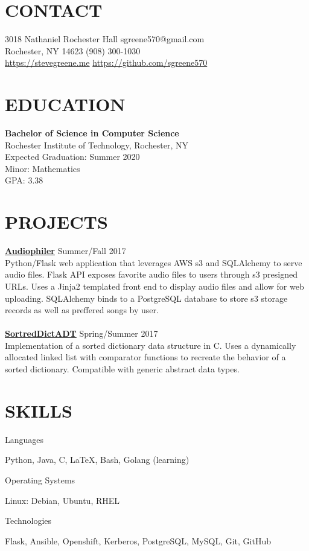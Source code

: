 \documentclass[line, margin, 11pt]{res}
\begin{document}

\begin{resume}

\section {CONTACT}
3018 Nathaniel Rochester Hall \hfill sgreene570@gmail.com \\
Rochester, NY 14623 \hfill (908) 300-1030 \\
\url{https://stevegreene.me} \hfill \url{https://github.com/sgreene570}

\section{EDUCATION}
{\bf Bachelor of Science in Computer Science} \\
Rochester Institute of Technology, Rochester, NY \\
Expected Graduation: Summer 2020 \\
Minor: Mathematics \\
GPA: 3.38

\section{PROJECTS}
{\bf \href{https://github.com/sgreene570/audiophiler}{Audiophiler}} \hfill Summer/Fall 2017 \\
Python/Flask web application that leverages AWS s3 and SQLAlchemy to serve audio
files.  Flask API exposes favorite audio files to users through s3 presigned URLs.
Uses a Jinja2 templated front end to display audio files and allow for web uploading.  SQLAlchemy binds
to a PostgreSQL database to store s3 storage records as well as preffered songs by user.
\\
\\
{\bf \href{https://github.com/sgreene570/SortedDictADT}{SortredDictADT}} \hfill Spring/Summer 2017 \\
Implementation of a sorted dictionary data structure in C.  Uses a dynamically allocated linked list with comparator functions
to recreate the behavior of a sorted dictionary.  Compatible with generic abstract data types.

\section{SKILLS}
\begin{compactdesc}
    \item[Languages] \begin{inparaenum} {Python, Java, C, \LaTeX, Bash, Golang (learning)} \end{inparaenum}
    \item[Operating Systems] \begin{inparaenum} {Linux: Debian, Ubuntu, RHEL} \end{inparaenum}
    \item[Technologies] \begin{inparaenum} {Flask, Ansible, Openshift, Kerberos, PostgreSQL, MySQL, Git, GitHub} \end{inparaenum}
\end{compactdesc}


\end{resume}
\end{document}
